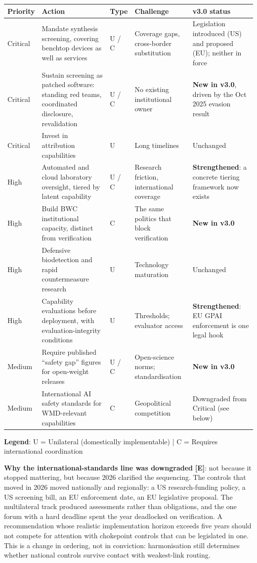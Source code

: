 \documentclass[11pt,letterpaper]{article}
\begin{document}
\begin{center}
\small
\begin{tabular}{L{1.4cm}L{4.6cm}L{1.2cm}L{3.4cm}L{3.4cm}}
\toprule
\textbf{Priority} & \textbf{Action} & \textbf{Type} & \textbf{Challenge} & \textbf{v3.0 status} \\
\midrule
Critical & Mandate synthesis screening, covering benchtop devices as well as services & U / C & Coverage gaps, cross-border substitution & Legislation introduced (US) and proposed (EU); neither in force \\
Critical & Sustain screening as patched software: standing red teams, coordinated disclosure, revalidation & U / C & No existing institutional owner & \textbf{New in v3.0}, driven by the Oct 2025 evasion result \\
Critical & Invest in attribution capabilities & U & Long timelines & Unchanged \\
High & Automated and cloud laboratory oversight, tiered by latent capability & U / C & Research friction, international coverage & \textbf{Strengthened}: a concrete tiering framework now exists \\
High & Build BWC institutional capacity, distinct from verification & C & The same politics that block verification & \textbf{New in v3.0} \\
High & Defensive biodetection and rapid countermeasure research & U & Technology maturation & Unchanged \\
High & Capability evaluations before deployment, with evaluation-integrity conditions & U & Thresholds; evaluator access & \textbf{Strengthened}: EU GPAI enforcement is one legal hook \\
Medium & Require published ``safety gap'' figures for open-weight releases & U / C & Open-science norms; standardisation & \textbf{New in v3.0} \\
Medium & International AI safety standards for WMD-relevant capabilities & C & Geopolitical competition & Downgraded from Critical (see below) \\
\bottomrule
\end{tabular}
\end{center}

\textbf{Legend}: U = Unilateral (domestically implementable) | C = Requires international coordination

\textbf{Why the international-standards line was downgraded} \textbf{[E]}: not because it stopped mattering, but because 2026 clarified the sequencing. The controls that moved in 2026 moved nationally and regionally: a US research-funding policy, a US screening bill, an EU enforcement date, an EU legislative proposal. The multilateral track produced assessments rather than obligations, and the one forum with a hard deadline spent the year deadlocked on verification. A recommendation whose realistic implementation horizon exceeds five years should not compete for attention with chokepoint controls that can be legislated in one. This is a change in ordering, not in conviction: harmonisation still determines whether national controls survive contact with weakest-link routing.
\end{document}
